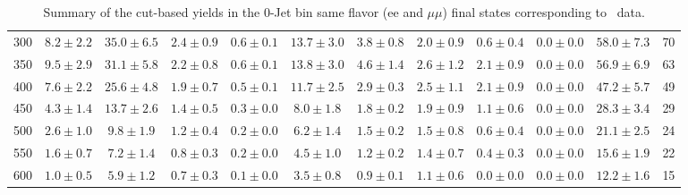 \begin{table}[!ht]
{\begin{center}
\begin{tabular}{l c c c c c c c c c c c }
300 & $8.2\pm2.2$ & $35.0\pm6.5$ & $2.4\pm0.9$ & $0.6\pm0.1$ & $13.7\pm3.0$ & $3.8\pm0.8$ & $2.0\pm0.9$ & $0.6\pm0.4$ & $0.0\pm0.0$ & $58.0\pm7.3$ & 70 \\
350 & $9.5\pm2.9$ & $31.1\pm5.8$ & $2.2\pm0.8$ & $0.6\pm0.1$ & $13.8\pm3.0$ & $4.6\pm1.4$ & $2.6\pm1.2$ & $2.1\pm0.9$ & $0.0\pm0.0$ & $56.9\pm6.9$ & 63 \\
400 & $7.6\pm2.2$ & $25.6\pm4.8$ & $1.9\pm0.7$ & $0.5\pm0.1$ & $11.7\pm2.5$ & $2.9\pm0.3$ & $2.5\pm1.1$ & $2.1\pm0.9$ & $0.0\pm0.0$ & $47.2\pm5.7$ & 49 \\
450 & $4.3\pm1.4$ & $13.7\pm2.6$ & $1.4\pm0.5$ & $0.3\pm0.0$ & $8.0\pm1.8$ & $1.8\pm0.2$ & $1.9\pm0.9$ & $1.1\pm0.6$ & $0.0\pm0.0$ & $28.3\pm3.4$ & 29 \\
500 & $2.6\pm1.0$ & $9.8\pm1.9$ & $1.2\pm0.4$ & $0.2\pm0.0$ & $6.2\pm1.4$ & $1.5\pm0.2$ & $1.5\pm0.8$ & $0.6\pm0.4$ & $0.0\pm0.0$ & $21.1\pm2.5$ & 24 \\
550 & $1.6\pm0.7$ & $7.2\pm1.4$ & $0.8\pm0.3$ & $0.2\pm0.0$ & $4.5\pm1.0$ & $1.2\pm0.2$ & $1.4\pm0.7$ & $0.4\pm0.3$ & $0.0\pm0.0$ & $15.6\pm1.9$ & 22 \\
600 & $1.0\pm0.5$ & $5.9\pm1.2$ & $0.7\pm0.3$ & $0.1\pm0.0$ & $3.5\pm0.8$ & $0.9\pm0.1$ & $1.1\pm0.6$ & $0.0\pm0.0$ & $0.0\pm0.0$ & $12.2\pm1.6$ & 15 \\
\hline
\end{tabular}
\end{center}
}
\caption{Summary of the cut-based yields in the 0-Jet bin same flavor (ee and $\mu\mu$) final states corresponding to \intlumi\ data. }
\end{table}

